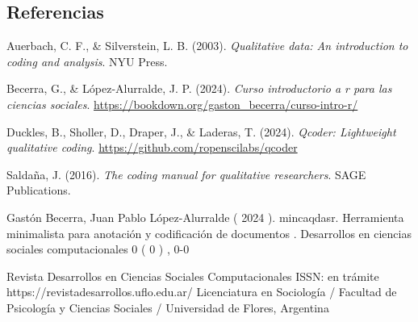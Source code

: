 \documentclass[
]{article}
\newlength{\cslhangindent}
\newenvironment{CSLReferences}[2] %
 {\begin{list}{}{%
  \setlength{\itemindent}{0pt}
  \setlength{\leftmargin}{0pt}
  \setlength{\parsep}{0pt}
  \ifodd #1
   \setlength{\leftmargin}{\cslhangindent}
   \setlength{\itemindent}{-1\cslhangindent}
  \fi
  \setlength{\itemsep}{#2\baselineskip}}}
 {\end{list}}
\begin{document}
\subsection{Referencias}\label{referencias}

\label{refs}
\begin{CSLReferences}{1}{0}
Auerbach, C. F., \& Silverstein, L. B. (2003). \emph{Qualitative data:
An introduction to coding and analysis}. NYU Press.

Becerra, G., \& López-Alurralde, J. P. (2024). \emph{Curso introductorio
a r para las ciencias sociales}.
\url{https://bookdown.org/gaston_becerra/curso-intro-r/}

Duckles, B., Sholler, D., Draper, J., \& Laderas, T. (2024).
\emph{Qcoder: Lightweight qualitative coding}.
\url{https://github.com/ropenscilabs/qcoder}

Saldaña, J. (2016). \emph{The coding manual for qualitative
researchers}. SAGE Publications.

\end{CSLReferences}

Gastón Becerra, Juan Pablo López-Alurralde ( 2024 ). mincaqdasr.
Herramienta minimalista para anotación y codificación de documentos .
Desarrollos en ciencias sociales computacionales 0 ( 0 ) , 0-0

Revista Desarrollos en Ciencias Sociales Computacionales \textbar{}
ISSN: en trámite https://revistadesarrollos.uflo.edu.ar/ Licenciatura en
Sociología / Facultad de Psicología y Ciencias Sociales / Universidad de
Flores, Argentina
\end{document}
